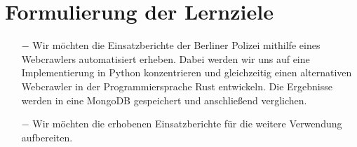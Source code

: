 \chapter{Formulierung der Lernziele}

\begin{itemize}
	\item[$-$] Wir möchten die Einsatzberichte der Berliner Polizei mithilfe eines Webcrawlers automatisiert erheben. Dabei werden wir uns auf eine Implementierung in Python konzentrieren und gleichzeitig einen alternativen Webcrawler in der Programmiersprache Rust entwickeln. Die Ergebnisse werden in eine MongoDB gespeichert und anschließend verglichen.
	\item[$-$] Wir möchten die erhobenen Einsatzberichte für die weitere Verwendung aufbereiten.
\end{itemize}